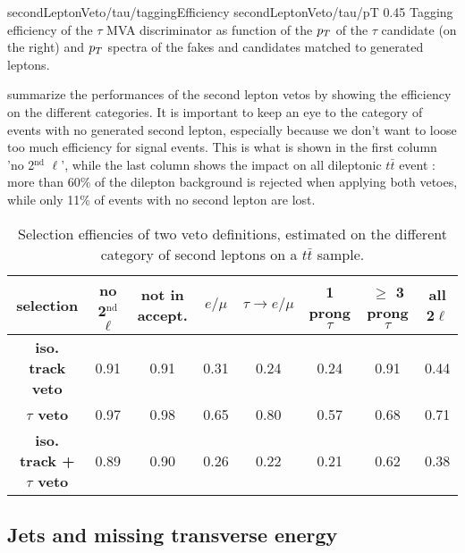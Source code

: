                      {secondLeptonVeto/tau/taggingEfficiency}
                     {secondLeptonVeto/tau/pT}
                     {0.45}
                     {Tagging efficiency of the $\tau$ MVA discriminator as function of the
                     $p_T$ of the $\tau$ candidate (on the right) and $p_T$ spectra of
                     the fakes and candidates matched to generated leptons.}

     summarize the performances of the
    second lepton vetos by showing the efficiency on the different categories.
    It is important to keep an eye to the category of events with no generated second lepton,
    especially because we don't want to loose too much efficiency for signal events.
    This is what is shown in the first column 'no 2$^\text{nd}$ $\ell$', while the last
    column shows the impact on all dileptonic $t\bar{t}$ event : more than 60\% of the dilepton
    background is rejected when applying both vetoes, while only 11\% of events with no
    second lepton are lost.

    \begin{table}
    \hspace*{-1.2cm}
    \begin{tabular}{|c|c|ccccc|c|}
        \hline
        \textbf{selection}                  & no 2$^\text{nd}$ $\ell$ & not in accept. & $e/\mu$ & $\tau \rightarrow e/\mu$ & 1 prong $\tau $ & $\geq$ 3 prong $\tau$ & all 2$\ell$ \\
        \hline
        \textbf{iso. track veto}            & 0.91                    & 0.91  & 0.31  & 0.24  & 0.24  & 0.91  & 0.44  \\
        \textbf{$\tau$ veto}                & 0.97                    & 0.98  & 0.65  & 0.80  & 0.57  & 0.68  & 0.71  \\
        \hline
        \textbf{iso. track + $\tau$ veto}   & 0.89                    & 0.90  & 0.26  & 0.22  & 0.21  & 0.62  & 0.38 \\
        \hline
    \end{tabular}
        \caption{Selection effiencies of two veto definitions, estimated on the different category of second leptons on a $t\bar{t}$ sample.}
        \label{tab:secondLeptonVetoPerformances}
    \end{table}

        \subsection{Jets and missing transverse energy}

